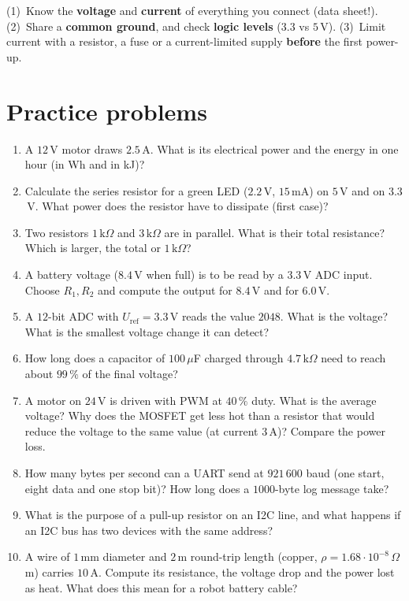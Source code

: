\begin{keyidea}
(1)~Know the \textbf{voltage} and \textbf{current} of everything you connect (data sheet!). (2)~Share a \textbf{common ground}, and check \textbf{logic levels} ($3.3$ vs $5$\,V). (3)~Limit current with a resistor, a fuse or a current-limited supply \textbf{before} the first power-up.
\end{keyidea}

\section*{Practice problems}
\begin{enumerate}[label=\textbf{\thechapter.\arabic*}]
  \item A $12$\,V motor draws $2.5$\,A. What is its electrical power and the energy in one hour (in Wh and in kJ)?
  \item Calculate the series resistor for a green LED ($2.2$\,V, $15$\,mA) on $5$\,V and on $3.3$\,V. What power does the resistor have to dissipate (first case)?
  \item Two resistors $1\,\text{k}\Omega$ and $3\,\text{k}\Omega$ are in parallel. What is their total resistance? Which is larger, the total or $1\,\text{k}\Omega$?
  \item A battery voltage ($8.4$\,V when full) is to be read by a $3.3$\,V ADC input. Choose $R_1,R_2$ and compute the output for $8.4$\,V and for $6.0$\,V.
  \item A $12$-bit ADC with $U_\text{ref}=3.3$\,V reads the value $2048$. What is the voltage? What is the smallest voltage change it can detect?
  \item How long does a capacitor of $100\,\mu$F charged through $4.7\,\text{k}\Omega$ need to reach about $99\,\%$ of the final voltage?
  \item A motor on $24$\,V is driven with PWM at $40\,\%$ duty. What is the average voltage? Why does the MOSFET get less hot than a resistor that would reduce the voltage to the same value (at current $3$\,A)? Compare the power loss.
  \item How many bytes per second can a UART send at $921\,600$ baud (one start, eight data and one stop bit)? How long does a $1000$-byte log message take?
  \item What is the purpose of a pull-up resistor on an I2C line, and what happens if an I2C bus has two devices with the same address?
  \item[\textbf{\thechapter.10}$\star$] A wire of $1$\,mm diameter and $2$\,m round-trip length (copper, $\rho=1.68\cdot10^{-8}\,\Omega$m) carries $10$\,A. Compute its resistance, the voltage drop and the power lost as heat. What does this mean for a robot battery cable?
\end{enumerate}
